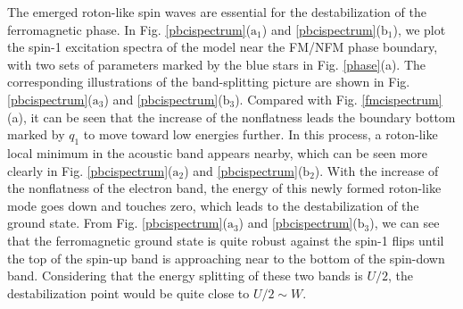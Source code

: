 \documentclass[amsmath,superscriptaddress,showpacs,aps,prb,twocolumn]{revtex4-1}
\begin{document}
\par The emerged roton-like spin waves are essential for the destabilization of the ferromagnetic phase. In Fig. \ref{pbcispectrum}($\text{a}_1$) and \ref{pbcispectrum}($\text{b}_1$), we plot the spin-1 excitation spectra of the model near the FM/NFM phase boundary, with two sets of parameters marked by the blue stars in Fig. \ref{phase}(a). The corresponding illustrations of the band-splitting picture are shown in Fig. \ref{pbcispectrum}($\text{a}_3$) and \ref{pbcispectrum}($\text{b}_3$). Compared with Fig. \ref{fmcispectrum}(a), it can be seen that the increase of the nonflatness leads the boundary bottom marked by $q_1$ to move toward low energies further. In this process, a roton-like local minimum in the acoustic band appears nearby, which can be seen more clearly in Fig. \ref{pbcispectrum}($\text{a}_2$) and \ref{pbcispectrum}($\text{b}_2$). With the increase of the nonflatness of the electron band, the energy of this newly formed roton-like mode goes down and touches zero, which leads to the destabilization of the ground state. From Fig. \ref{pbcispectrum}($\text{a}_3$) and \ref{pbcispectrum}($\text{b}_3$), we can see that the ferromagnetic ground state is quite robust against the spin-1 flips until the top of the spin-up band is approaching near to the bottom of the spin-down band. Considering that the energy splitting of these two bands is $U/2$, the destabilization point would be quite close to $U/2\sim W$.
\end{document}
